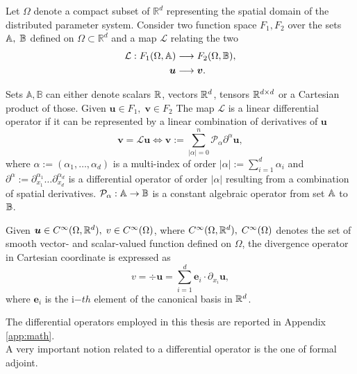 Let $\Omega$ denote a compact subset of $\mathbb{R}^d$ representing the spatial domain of the distributed parameter system. Consider two function space $F_1, F_2$ over the sets $\mathbb{A}, \; \mathbb{B}$ defined on $\Omega \subset \mathbb{R}^d$ and a map $\mathcal{L}$ relating the two
\begin{equation}
	\begin{aligned}
	\mathcal{L}: F_1(\Omega, \mathbb{A}) &\longrightarrow F_2(\Omega, \mathbb{B}), \\
			     \bm{u} &\longrightarrow \bm{v}.
	\end{aligned}
\end{equation}

Sets $\mathbb{A}, \mathbb{B}$ can either denote  scalars $\mathbb{R}$, vectors $\mathbb{R}^d$,  tensors $\mathbb{R}^{d \times d}$ or a Cartesian product of those. Given $\bm{u} \in F_1, \;  \bm{v} \in F_2$ The map $\mathcal{L}$ is a linear differential operator if it can be represented by a linear combination of derivatives of $\bm{u}$
\begin{equation}
\bm{v} = \mathcal{L} \bm{u} \iff \bm{v} := \sum_{|\alpha|=0}^n  \mathcal{P}_{\alpha} \partial^{\alpha} \bm{u},
\end{equation}
where $\alpha := (\alpha_1, \dots , \alpha_d)$ is a multi-index of order $|\alpha| := \sum_{i=1}^d \alpha_i$ and $\partial^{\alpha} := \partial_{x_1}^{\alpha_1} \dots \partial_{x_d}^{\alpha_d}$ is a differential operator of order $|\alpha|$ resulting from a combination of spatial derivatives. $\mathcal{P}_\alpha: \mathbb{A} \rightarrow \mathbb{B}$ is a constant algebraic operator from set $\mathbb{A}$ to $\mathbb{B}$. 

\begin{example}
	Given $\bm{u} \in C^\infty(\Omega, \mathbb{R}^d), \; v \in C^\infty(\Omega)$, where $C^\infty(\Omega, \mathbb{R}^d), \; C^\infty(\Omega)$ denotes the set of smooth vector- and scalar-valued function defined on $\Omega$, the divergence operator in Cartesian coordinate is expressed as
	\begin{equation}
	v = \div \bm{u} = \sum_{i = 1}^d \bm{e}_i \cdot \partial_{x_i} \bm{u},
	\end{equation}
	where $\bm{e}_i$ is the i$-th$ element of the canonical basis in $\mathbb{R}^d$. 
\end{example}

The differential operators employed in this thesis are reported in Appendix \ref{app:math}. \\
A very important notion related to a differential operator is the one of formal adjoint. 

